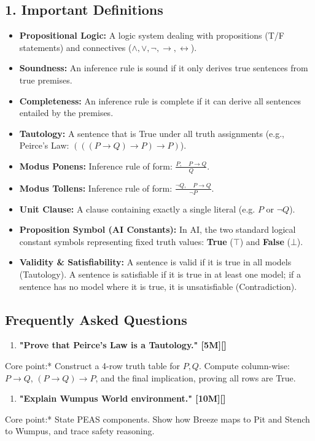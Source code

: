 \subsection{1. Important Definitions}
\begin{itemize}
  \item   \textbf{Propositional Logic:} A logic system dealing with propositions (T/F statements) and connectives ($\land, \lor, \neg, \rightarrow, \leftrightarrow$).
  \item   \textbf{Soundness:} An inference rule is sound if it only derives true sentences from true premises.
  \item   \textbf{Completeness:} An inference rule is complete if it can derive all sentences entailed by the premises.
  \item   \textbf{Tautology:} A sentence that is True under all truth assignments (e.g., Peirce's Law: $(((P \rightarrow Q) \rightarrow P) \rightarrow P)$).
  \item   \textbf{Modus Ponens:} Inference rule of form: $\frac{P, \quad P \rightarrow Q}{Q}$.
  \item   \textbf{Modus Tollens:} Inference rule of form: $\frac{\neg Q, \quad P \rightarrow Q}{\neg P}$.
  \item   \textbf{Unit Clause:} A clause containing exactly a single literal (e.g. $P$ or $\neg Q$).
  \item   \textbf{Proposition Symbol (AI Constants):} In AI, the two standard logical constant symbols representing fixed truth values: \textbf{True} ($\top$) and \textbf{False} ($\bot$).
  \item   \textbf{Validity \& Satisfiability:} A sentence is valid if it is true in all models (Tautology). A sentence is satisfiable if it is true in at least one model; if a sentence has no model where it is true, it is unsatisfiable (Contradiction).
\end{itemize}

\subsection{Frequently Asked Questions}
\begin{enumerate}
  \item \textbf{"Prove that Peirce's Law is a Tautology." [5M][]}
\end{enumerate}
    \textit{   }Core point:* Construct a 4-row truth table for $P, Q$. Compute column-wise: $P \rightarrow Q$, $(P \rightarrow Q) \rightarrow P$, and the final implication, proving all rows are True.
\begin{enumerate}
  \item \textbf{"Explain Wumpus World environment." [10M][]}
\end{enumerate}
    \textit{   }Core point:* State PEAS components. Show how Breeze maps to Pit and Stench to Wumpus, and trace safety reasoning.


